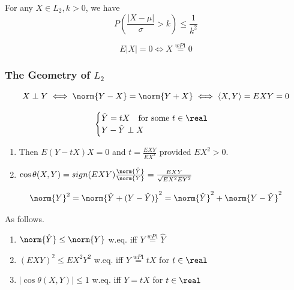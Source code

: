 \documentclass[11pt]{article}
\numberwithin{equation}{section}
\begin{document}
\corollary[Chebyshev II]
For any $X \in L_2, k > 0$, we have
\begin{equation}
	P\left( \frac{|X - \mu|}{\sigma} > k \right) \leq \frac{1}{k^2}
\end{equation}

\begin{equation}
	E|X| = 0 \iff X \overset{wP1} = 0
\end{equation}

\subsubsection{The Geometry of $L_2$}
\begin{equation}
	X \perp Y \iff \norm{Y - X} = \norm{Y + X} \iff \langle X, Y \rangle = EXY = 0
\end{equation}


\begin{equation}
	\begin{cases}
		\hat{Y} = tX \quad \text{for some $t \in \real$} \\
		Y - \hat{Y} \perp X
	\end{cases}
\end{equation}

\remark
\begin{enumerate}
	\item Then $E(Y - tX) X = 0$ and $t = \frac{EXY}{EX^2}$ provided $EX^2 > 0$.
	\item $\cos \theta(X,Y) = sign(EXY)\frac{\norm{\hat{Y}}}{\norm{Y}} = \frac{EXY}{\sqrt{EX^2EY^2}}$
\end{enumerate}


\begin{equation}
	\norm{Y}^2 = \norm{\hat{Y} + ( Y - \hat{Y})}^2 = \norm{\hat{Y}}^2 + \norm{Y - \hat{Y}}^2
\end{equation}

As follows.
\begin{enumerate}
	\item $\norm{\hat{Y}} \leq \norm{Y}$ w.eq. iff $Y \overset{wP1}{=} \hat{Y}$
	\item $(EXY)^2 \leq EX^2Y^2$ w.eq. iff $Y \overset{wP1}{=} tX$ for $t \in \real$
	\item $|\cos \theta(X, Y)| \leq 1$ w.eq. iff $Y = tX$ for $t \in \real$
\end{enumerate}
\end{document}
